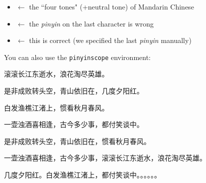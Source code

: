 \begin{mdframed}[frametitle={\colorbox{white}{Text with \emph{pinyin}}}]
	\begin{itemize}  	
		\item {} $\leftarrow$ the ``four tones" (+neutral tone) of Mandarin Chinese 
		\item {} $\leftarrow$ the \emph{pinyin} on the last character is wrong
		\item {} $\leftarrow$ this is correct (we specified the last \emph{pinyin} manually)
	\end{itemize}

	\bigskip

	\begin{pinyinscope}
You can also use the \texttt{pinyinscope} environment:\par
\bigskip
滚滚长江东逝水，浪花淘尽英雄。\par
是非成败转头空，青山依旧在，几度夕阳红。\par
白发渔樵江渚上，惯看秋月春风。\par
一壶浊酒喜相逢，古今多少事，都付笑谈中。\par
\bigskip
是非成败转头空，青山依旧在，惯看秋月春风。\par
一壶浊酒喜相逢，古今多少事，滚滚长江东逝水，浪花淘尽英雄。\par
几度夕阳红。白发渔樵江渚上，都付笑谈中。。。。。。\par
	\end{pinyinscope}	
\end{mdframed}
